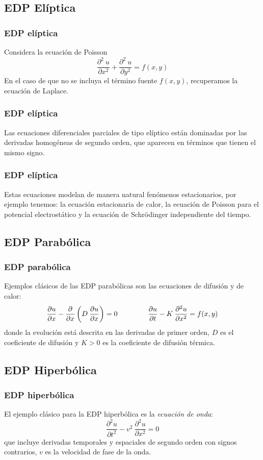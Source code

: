 \subsection{EDP Elíptica}
\begin{frame}
\frametitle{EDP elíptica}
Considera la ecuación de Poisson
\[ \dfrac{\partial^{2} \: u}{\partial x^{2}} + \dfrac{\partial^{2} \: u}{\partial y^{2}} = f(x, y) \]
En el caso de que no se incluya el término fuente $f(x, y)$, recuperamos la ecuación de Laplace.
\end{frame}
\begin{frame}
\frametitle{EDP elíptica}
Las ecuaciones diferenciales parciales de tipo elíptico están dominadas por las derivadas homogéneas de segundo orden, que aparecen en términos que tienen el mismo signo.
\end{frame}
\begin{frame}
\frametitle{EDP elíptica}
Estas ecuaciones modelan de manera natural fenómenos estacionarios, por ejemplo tenemos: la ecuación estacionaria de calor, la ecuación de Poisson para el potencial electrostático y la ecuación de Schrödinger independiente del tiempo.
\end{frame}
\subsection{EDP Parabólica}
\begin{frame}
\frametitle{EDP parabólica}
Ejemplos clásicos de las EDP parabólicas son las ecuaciones de difusión y de calor:
\[ \dfrac{\partial u}{\partial x} - \dfrac{\partial}{\partial x} \left( D \: \dfrac{\partial u}{\partial x} \right) = 0 \hspace{1.5cm} \dfrac{\partial u}{\partial t} - K \: \dfrac{\partial^{2} u}{\partial x^{2}}  = f(x,y) \]
\pause
donde la evolución está descrita en las derivadas de primer orden, $D$ es el coeficiente de difusión y $K > 0$ es la coeficiente de difusión térmica.
\end{frame}
\subsection{EDP Hiperbólica}
\begin{frame}
\frametitle{EDP hiperbólica}
El ejemplo clásico para la EDP hiperbólica es la \emph{ecuación de onda}:
\[ \dfrac{\partial^{2} u}{\partial t^{2}}  - v^{2} \: \dfrac{\partial^{2} u}{\partial x^{2}} = 0 \]
que incluye derivadas temporales y espaciales de segundo orden con signos contrarios, $v$ es la velocidad de fase de la onda.
\end{frame}
